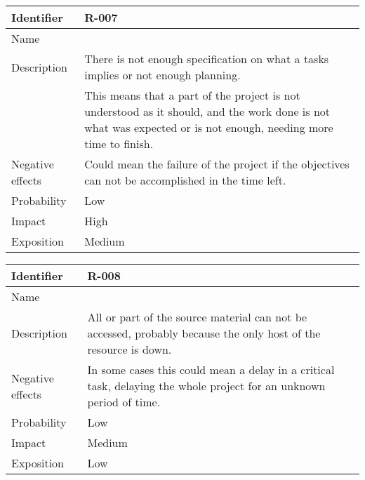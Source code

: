 \begin{table}[H]
	\begin{tabularx}{\textwidth}{|l|X|}
		\hline
		\rowcolor{gray!30}
		Identifier & \textbf{R-007} \\ \hline
		Name & \Rsiete \\ \hline
		Description
			& There is not enough specification on what a tasks implies or not enough planning. \\
			& This means that a part of the project is not understood as it should, and the work done is not what was expected or is not enough, needing more time to finish. \\ \hline
		Negative effects
			& Could mean the failure of the project if the objectives can not be accomplished in the time left. \\ \hline
		Probability & Low\\ \hline
		Impact &  High\\ \hline
		Exposition &  Medium\\ \hline
	\end{tabularx}
\end{table}

\begin{table}[H]
	\begin{tabularx}{\textwidth}{|l|X|}
		\hline
		\rowcolor{gray!30}
		Identifier & \textbf{R-008} \\ \hline
		Name & \Rocho \\ \hline
		Description
			& All or part of the source material can not be accessed, probably because the only host of the resource is down. \\
		Negative effects
			& In some cases this could mean a delay in a critical task, delaying the whole project for an unknown period of time.\\ \hline
		Probability & Low\\ \hline
		Impact & Medium\\ \hline
		Exposition & Low\\ \hline
	\end{tabularx}
\end{table}

